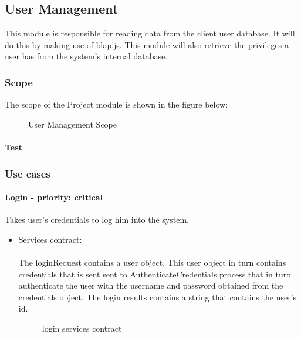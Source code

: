 \subsection{User Management}
This module is responsible for reading data from the client user database. It will do this by making use of ldap.js. This module will also retrieve the privileges a user has from the system's internal database.

\subsubsection{Scope}
The scope of the Project module is shown in the figure below:
	\begin{figure}[H]
	    	\centering
	    	\caption{User Management Scope}
	    	\label{fig:UserManagementScope}
   	\end{figure}
\paragraph{Test}
\subsubsection{Use cases}

\paragraph{Login - priority: critical}
Takes user's credentials to log him into the system.

\begin{itemize}
	\item Services contract:\\ \\
	The loginRequest contains a user object. This user object in turn contains credentials that is sent sent to AuthenticateCredentials process that in turn authenticate the user with the username and password obtained from the credentials object. The login results contains a string that contains the user's id.
	\begin{figure}[H]
    	\centering
    	\caption{login services contract}
    	\label{fig:login_services_contract}
   	\end{figure}
\end{itemize}


